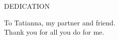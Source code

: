 \newpage
{}

\begin{center}
DEDICATION
\end{center}

\begin{center}
To Tatianna, my partner and friend.\\
Thank you for all you do for me.
\end{center}
